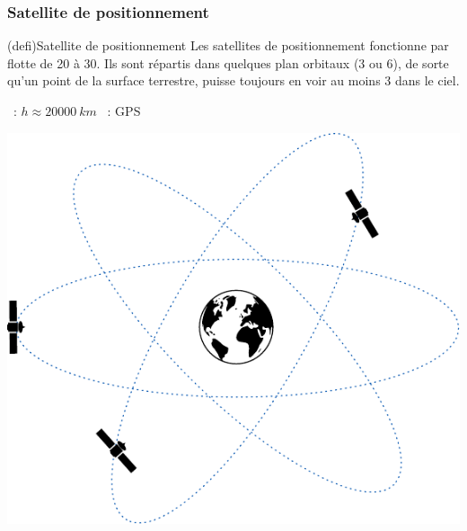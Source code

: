 \documentclass[../../main/main.tex]{subfiles}
\begin{document}
\subsubsection{Satellite de positionnement}
\begin{tcb*}[sidebyside](defi){Satellite de positionnement}
	Les satellites de positionnement fonctionne par flotte de 20 à 30. Ils sont
	répartis dans quelques plan orbitaux (3 ou 6), de sorte qu'un point de la
	surface terrestre, puisse toujours en voir au moins 3 dans le ciel.
	\begin{itemize}
		~: $h \approx \SI{20000}{km}$
		~: GPS
	\end{itemize}
	\tcblower
	\begin{center}
		\includegraphics[width=.6\linewidth]{sat_pos}
	\end{center}
\end{tcb*}
\end{document}

